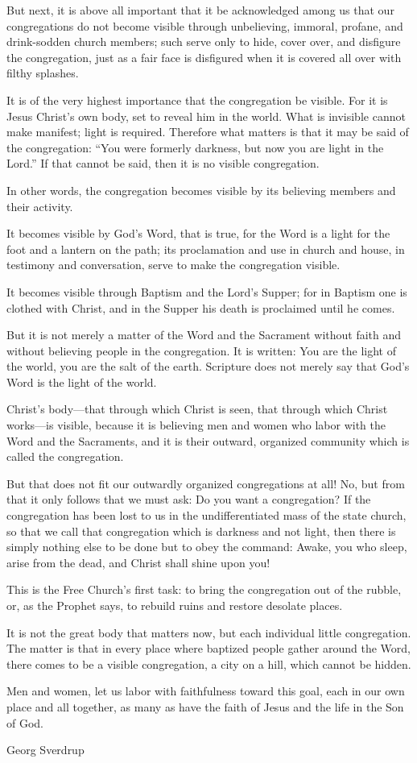 But next, it is above all important that it be acknowledged among us that our congregations do not become visible through unbelieving, immoral, profane, and drink-sodden church members; such serve only to hide, cover over, and disfigure the congregation, just as a fair face is disfigured when it is covered all over with filthy splashes.

It is of the very highest importance that the congregation be visible. For it is Jesus Christ’s own body, set to reveal him in the world. What is invisible cannot make manifest; light is required. Therefore what matters is that it may be said of the congregation: “You were formerly darkness, but now you are light in the Lord.” If that cannot be said, then it is no visible congregation.

In other words, the congregation becomes visible by its believing members and their activity.

It becomes visible by God’s Word, that is true, for the Word is a light for the foot and a lantern on the path; its proclamation and use in church and house, in testimony and conversation, serve to make the congregation visible.

It becomes visible through Baptism and the Lord’s Supper; for in Baptism one is clothed with Christ, and in the Supper his death is proclaimed until he comes.

But it is not merely a matter of the Word and the Sacrament without faith and without believing people in the congregation. It is written: You are the light of the world, you are the salt of the earth. Scripture does not merely say that God’s Word is the light of the world.

Christ’s body—that through which Christ is seen, that through which Christ works—is visible, because it is believing men and women who labor with the Word and the Sacraments, and it is their outward, organized community which is called the congregation.

But that does not fit our outwardly organized congregations at all! No, but from that it only follows that we must ask: Do you want a congregation? If the congregation has been lost to us in the undifferentiated mass of the state church, so that we call that congregation which is darkness and not light, then there is simply nothing else to be done but to obey the command: Awake, you who sleep, arise from the dead, and Christ shall shine upon you!

This is the Free Church’s first task: to bring the congregation out of the rubble, or, as the Prophet says, to rebuild ruins and restore desolate places.

It is not the great body that matters now, but each individual little congregation. The matter is that in every place where baptized people gather around the Word, there comes to be a visible congregation, a city on a hill, which cannot be hidden.

Men and women, let us labor with faithfulness toward this goal, each in our own place and all together, as many as have the faith of Jesus and the life in the Son of God.

Georg Sverdrup
